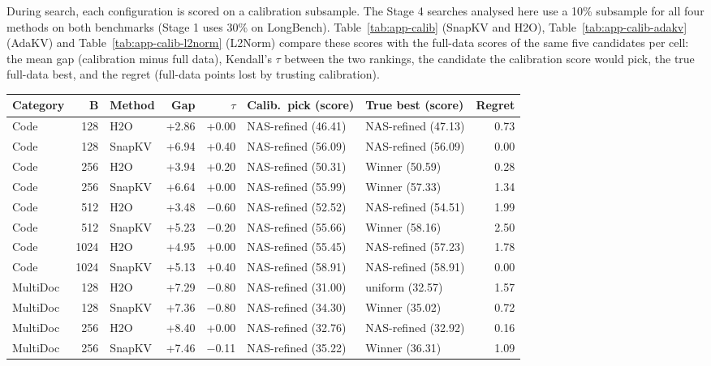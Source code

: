 During search, each configuration is scored on a calibration subsample. The Stage 4 searches analysed here use a 10\% subsample for all four methods on both benchmarks (Stage 1 uses 30\% on LongBench). Table~\ref{tab:app-calib} (SnapKV and H2O), Table~\ref{tab:app-calib-adakv} (AdaKV) and Table~\ref{tab:app-calib-l2norm} (L2Norm) compare these scores with the full-data scores of the same five candidates per cell: the mean gap (calibration minus full data), Kendall's $\tau$ between the two rankings, the candidate the calibration score would pick, the true full-data best, and the regret (full-data points lost by trusting calibration).

\begin{table}[t]
  \centering
  \footnotesize
  \setlength{\tabcolsep}{4pt}
  \begin{tabular}{@{}l r l r r l l r@{}}
    \toprule
    Category & B & Method & Gap & $\tau$ & Calib.\ pick (score) & True best (score) & Regret \\
    \midrule
    Code & 128 & H2O & +2.86 & +0.00 & NAS-refined (46.41) & NAS-refined (47.13) & 0.73 \\
    Code & 128 & SnapKV & +6.94 & +0.40 & NAS-refined (56.09) & NAS-refined (56.09) & 0.00 \\
    Code & 256 & H2O & +3.94 & +0.20 & NAS-refined (50.31) & Winner (50.59) & 0.28 \\
    Code & 256 & SnapKV & +6.64 & +0.00 & NAS-refined (55.99) & Winner (57.33) & 1.34 \\
    Code & 512 & H2O & +3.48 & $-$0.60 & NAS-refined (52.52) & NAS-refined (54.51) & 1.99 \\
    Code & 512 & SnapKV & +5.23 & $-$0.20 & NAS-refined (55.66) & Winner (58.16) & 2.50 \\
    Code & 1024 & H2O & +4.95 & +0.00 & NAS-refined (55.45) & NAS-refined (57.23) & 1.78 \\
    Code & 1024 & SnapKV & +5.13 & +0.40 & NAS-refined (58.91) & NAS-refined (58.91) & 0.00 \\
    MultiDoc & 128 & H2O & +7.29 & $-$0.80 & NAS-refined (31.00) & uniform (32.57) & 1.57 \\
    MultiDoc & 128 & SnapKV & +7.36 & $-$0.80 & NAS-refined (34.30) & Winner (35.02) & 0.72 \\
    MultiDoc & 256 & H2O & +8.40 & +0.00 & NAS-refined (32.76) & NAS-refined (32.92) & 0.16 \\
    MultiDoc & 256 & SnapKV & +7.46 & $-$0.11 & NAS-refined (35.22) & Winner (36.31) & 1.09 \\

\end{tabular}
\end{table}
